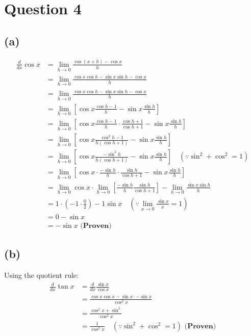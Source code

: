 \documentclass[11pt]{article}
\begin{document}
\section{Question 4}
\label{sec:orgba3de7a}

\subsection{(a)}
\label{sec:org1b89671}

\begin{align*}
\frac{d}{dx} \cos x &= \lim_{h \rightarrow 0} \frac{\cos (x + h) - \cos x}{h} \\
&= \lim_{h \rightarrow 0} \frac{\cos x \cos h - \sin x \sin h - \cos x}{h} \\
&= \lim_{h \rightarrow 0} \frac{\cos x \cos h - \sin x \sin h - \cos x}{h} \\
&= \lim_{h \rightarrow 0} \left[\cos x \frac{\cos h - 1}{h} - \sin x \frac{\sin h}{h} \right] \\
&= \lim_{h \rightarrow 0} \left[\cos x \frac{\cos h - 1}{h} \cdot \frac{\cos h + 1}{\cos h + 1} - \sin x \frac{\sin h}{h} \right] \\
&= \lim_{h \rightarrow 0} \left[\cos x \frac{\cos^2 h - 1}{h(\cos h + 1)} - \sin x \frac{\sin h}{h} \right] \\
&= \lim_{h \rightarrow 0} \left[\cos x \frac{- \sin^2 h}{h(\cos h + 1)} - \sin x \frac{\sin h}{h} \right] \quad (\because \sin^2 + \cos^2 = 1) \\
&= \lim_{h \rightarrow 0} \left[\cos x \cdot \frac{- \sin h}{h} \cdot \frac{\sin h}{\cos h + 1} - \sin x \frac{\sin h}{h} \right] \\
&= \lim_{h \rightarrow 0} \cos x \cdot \lim_{h \rightarrow 0} \left[ \frac{- \sin h}{h} \frac{\sin h}{\cos h + 1} \right] - \lim_{h \rightarrow 0} \frac{\sin x \sin h}{h} \\
&= 1 \cdot \left( -1 \cdot \frac{0}{2} \right) - 1 \sin x \quad \left(\because \lim_{x \rightarrow 0} \frac{\sin x}{x} = 1 \right) \\
&= 0 - \sin x \\
&= - \sin x \textbf{ (Proven)}
\end{align*}

\subsection{(b)}
\label{sec:org8ddb930}

Using the quotient rule:
\begin{align*}
\frac{d}{dx} \tan x &= \frac{d}{dx} \frac{\sin x}{\cos x} \\
&= \frac{\cos x \cos x - \sin x \cdot - \sin x}{\cos^2 x} \\
&= \frac{\cos^2 x + \sin^2}{\cos^2 x} \\
&= \frac{1}{\cos^2 x} \quad (\because \sin^2 + \cos^2 = 1) \textbf{ (Proven)}
\end{align*}
\end{document}
